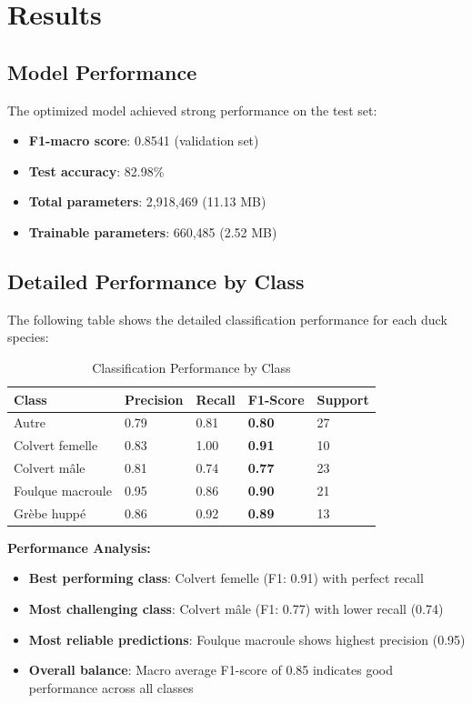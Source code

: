 \documentclass[12pt,a4paper]{article}
\begin{document}
\section{Results}

\subsection{Model Performance}

The optimized model achieved strong performance on the test set:

\begin{itemize}
    \item \textbf{F1-macro score}: 0.8541 (validation set)
    \item \textbf{Test accuracy}: 82.98\%
    \item \textbf{Total parameters}: 2,918,469 (11.13 MB)
    \item \textbf{Trainable parameters}: 660,485 (2.52 MB)
\end{itemize}

\subsection{Detailed Performance by Class}

The following table shows the detailed classification performance for each duck species:

\begin{table}[H]
\centering
\caption{Classification Performance by Class}
\begin{tabular}{@{}lllll@{}}
\toprule
\textbf{Class} & \textbf{Precision} & \textbf{Recall} & \textbf{F1-Score} & \textbf{Support} \\
\midrule
Autre & 0.79 & 0.81 & \textbf{0.80} & 27 \\
Colvert femelle & 0.83 & 1.00 & \textbf{0.91} & 10 \\
Colvert mâle & 0.81 & 0.74 & \textbf{0.77} & 23 \\
Foulque macroule & 0.95 & 0.86 & \textbf{0.90} & 21 \\
Grèbe huppé & 0.86 & 0.92 & \textbf{0.89} & 13 \\
\bottomrule
\end{tabular}
\end{table}

\textbf{Performance Analysis:}
\begin{itemize}
    \item \textbf{Best performing class}: Colvert femelle (F1: 0.91) with perfect recall
    \item \textbf{Most challenging class}: Colvert mâle (F1: 0.77) with lower recall (0.74)
    \item \textbf{Most reliable predictions}: Foulque macroule shows highest precision (0.95)
    \item \textbf{Overall balance}: Macro average F1-score of 0.85 indicates good performance across all classes
\end{itemize}
\end{document}
